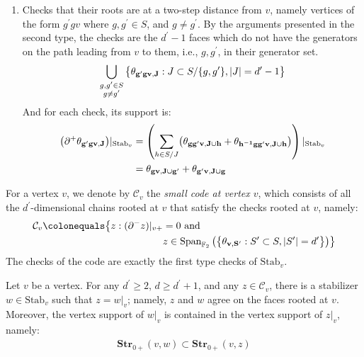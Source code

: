 \begin{enumerate}
\begin{equation*}
\begin{split}
      \end{split}
    \end{equation*}
  \item Checks that their roots are at a two-step distance from $v$, namely vertices of the form $g^{\prime}gv$ where $g, g^{\prime} \in S$, and $g \neq g^{\prime}$. By the arguments presented in the second type, the checks are the $d^{\prime}-1$ faces which do not have the generators on the path leading from $v$ to them, i.e., $g, g^{\prime}$, in their generator set.
    \begin{equation*}
      \begin{split}
        \bigcup_{\substack{g,g^{\prime}\in S\\g\ne g^{\prime}}}\big\{ \mathbf{\theta_{g^{\prime}gv ,J} }: J \subset S/\{g,g^{\prime}\}, |J|=d^{\prime}-1 \big\}
      \end{split}
    \end{equation*}
  And for each check, its support is:
    \begin{equation*}
      \begin{split}
        \bigl(\partial^+\mathbf{\theta_{g'g v ,J} }\bigr)|_{\text{Stab}_v}
        &=\left(\sum_{h\in S/J}\bigl(\mathbf{\theta_{gg'v ,J\cup h} }
                +\mathbf{\theta_{h^{-1}gg'v ,J\cup h} }\bigr)\right)|_{\text{Stab}_v}\\
        &=\mathbf{\theta_{gv ,J\cup g'} }+\mathbf{\theta_{g'v ,J\cup g} }
      \end{split}
    \end{equation*}
\end{enumerate}

\begin{definition}
For a vertex $v$, we denote by $\mathcal{C}_{v}$ the \textit{small code at vertex $v$}, which consists of all the $d^{\prime}$-dimensional chains rooted at $v$ that satisfy the checks rooted at $v$, namely:
  \begin{align*}
    \mathcal{C}_{v} \colonequals  \bigl\{ z : (\partial^{-} z)|_{v+}  &= 0 \text{ and } \\
    & z \in \operatorname{Span}_{\mathbb F_2} \big(  \big\{  \rotfvs{} : S^{\prime} \subset S, |S^{\prime}| = d^{\prime}  \big\} \big) \bigr\} 
  \end{align*}
The checks of the code are exactly the first type checks of $\text{Stab}_{v}$.
\end{definition}
\begin{claim}
  \label{claim:agreement}
  Let $v$ be a vertex. For any $d^{\prime}\ge 2$, $d\ge d^{\prime}+1$, and any $z \in \mathcal{C}_{v}$, there is a stabilizer $w \in \text{Stab}_{v}$ such that $z = w|_{v}$; namely, $z$ and $w$ agree on the faces rooted at $v$. Moreover, the vertex support of $w|_{v}$ is contained in the vertex support of $z|_{v}$, namely:
  \begin{equation*}
    \begin{split}
        \textbf{Str}_{0+}(v, w) \subset \textbf{Str}_{0+}(v, z)
    \end{split}
  \end{equation*}
\end{claim}


